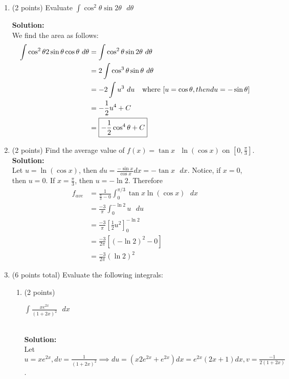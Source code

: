 \documentclass[paper=a4, fontsize=11pt]{scrartcl} %
\numberwithin{equation}{section} %
\numberwithin{figure}{section} %
\numberwithin{table}{section} %
\begin{document}
\begin{enumerate}
\setlength{\itemsep}{0.45in}
\item (2 points) Evaluate $\int \cos^2 \theta \sin 2\theta \text{  } d \theta$

\noindent\textbf{Solution:}\\
We find the area as follows:
\begin{align*}
\int \cos^2 \theta 2 \sin \theta \cos \theta \text{  } d \theta &= \int \cos^2 \theta \sin 2\theta \text{  } d \theta\\
&= 2 \int \cos^3 \theta \sin \theta \text{  } d \theta\\
&= -2 \int u^3  \text{  } d u  \hspace{.1in} \text{ where }[u=\cos \theta, then du = -\sin \theta]\\
&= -\frac{1}{2} u^4  + C\\
&= \boxed{ -\frac{1}{2} \cos^4 \theta  + C}
\end{align*}


\item (2 points) Find the average value of $f(x) = \tan x \text { }  \ln (\cos x)$ on $[0,\frac{\pi}{3}]$. \\
\noindent\textbf{Solution:}\\
Let $u=\ln (\cos x)$, then $du=\frac{- \sin x}{\cos x} dx = -\tan x \text { } dx$.  Notice, if $x=0$, then $u=0$.  If $x=\frac{\pi}{3}$, then $u=- \ln 2$.  Therefore
\begin{align*}
f_{ave} &= \frac{1}{\frac{\pi}{3}-0}\int_0^{\pi/3} \tan x \ln (\cos x)\text { }  dx\\
&= \frac{-3}{\pi} \int_0^{-\ln 2} u \text { }  du\\
&= \frac{-3}{\pi} \left[ \frac{1}{2} u^2 \right] _0^{-\ln 2} \\
&= \frac{-3}{2 \pi} \left[ (- \ln 2)^2 - 0 \right]  \\
&= \boxed{ \frac{-3}{2 \pi} ( \ln 2)^2   }
\end{align*}
\newpage

\item (6 points total) Evaluate the following integrals: 
\begin{enumerate}
\item (2 points) \begin{large}$\int \frac{x e^{2x}}{(1+2x)^2} \text {  } dx$\end{large} \\
\noindent\textbf{Solution:}\\
Let $u = x e^{2x}, dv = \frac{1}{(1+2x)^2} \implies du = (x 2e^{2x}+e^{2x})dx=e^{2x}(2x+1)dx, v = \frac{-1}{2(1+2x)}$.\\


\end{enumerate}
\end{enumerate}
\end{document}
